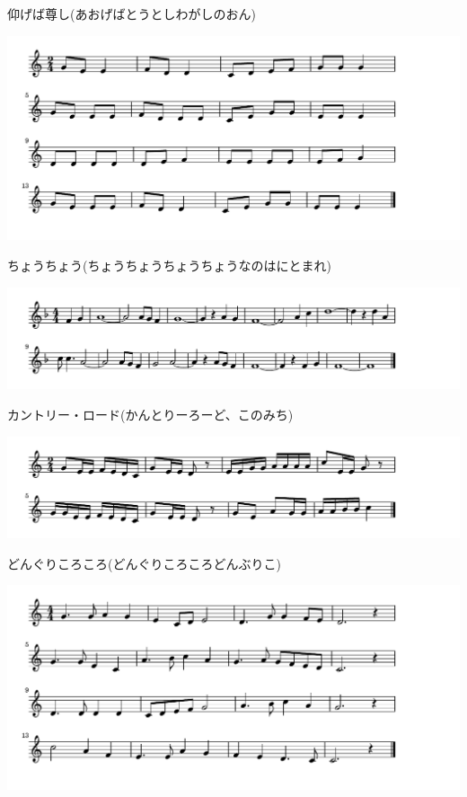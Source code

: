 \documentclass[a4paper]{ltjsarticle}
\begin{document}
\vspace{-10mm} \hspace{10mm}
仰げば尊し(あおげばとうとしわがしのおん)

\includegraphics[clip]{chouchou_crop.pdf}

\vspace{-10mm} \hspace{10mm}
ちょうちょう(ちょうちょうちょうちょうなのはにとまれ)

\includegraphics[clip]{countryroad_crop.pdf}

\vspace{-10mm} \hspace{10mm}
カントリー・ロード(かんとりーろーど、このみち)

\includegraphics[clip]{donguri_crop.pdf}

\vspace{-10mm} \hspace{10mm}
どんぐりころころ(どんぐりころころどんぶりこ)

\includegraphics[clip]{fujisan_crop.pdf}
\end{document}
